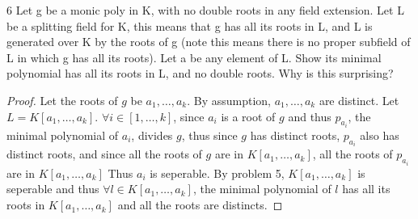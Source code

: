 \documentclass{article}
\begin{document}
\begin{PROB}{6}\label{Problem 6.}
    Let g be a monic poly in K, with no double roots in any field extension. Let L be a splitting field for K,
    this means that g has all its roots in L, and L is generated over K by the roots of g (note this means there is no proper subfield of L in which g has all its roots). Let a be any element of L. Show its minimal polynomial has all its roots in L, and no double roots.  Why is this surprising?  
\end{PROB}
\begin{proof}
    Let the roots of $g$ be $a_1, \dots, a_k$. By assumption, $a_1, \dots, a_k$ are distinct. Let $L = K[a_1, \dots, a_k]$. $\forall i \in [1, \dots, k]$, since $a_i$ is a root of $g$ and thus $p_{a_i}$, the minimal polynomial of $a_i$, divides $g$, thus since $g$ has distinct roots, $p_{a_i}$ also has distinct roots, and since all the roots of $g$ are in $K[a_1, \dots, a_k]$, all the roots of $p_{a_i}$ are in $K[a_1, \dots, a_k]$ Thus $a_i$ is seperable. By problem 5, $K[a_1, \dots, a_k]$ is seperable and thus $\forall l \in K[a_1, \dots, a_k]$, the minimal polynomial of $l$ has all its roots in $K[a_1, \dots, a_k]$ and all the roots are distincts.                    
\end{proof}
\end{document}
